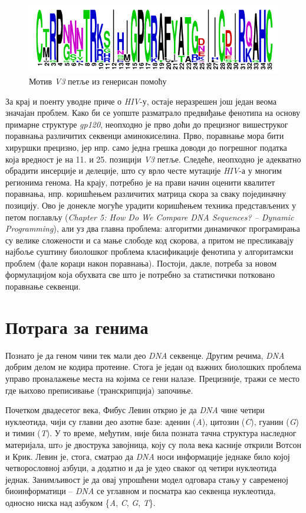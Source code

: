 \documentclass[12pt,oneside]{memoir}
\begin{document}
\begin{CJK}{UTF8}{ipxm}
\begin{figure}[!ht]
  \centering
  \includegraphics[width=.75\textwidth]{motif.png}
  \caption{Мотив \textit{V3} петље из \cite{compeau2015} генерисан помоћу \cite{weblogo}}
  \label{fig:motif}
\end{figure}

За крај и поенту уводне приче о \textit{HIV}-у, остаје неразрешен још један веома значајан проблем. Како би се уопште разматрало предвиђање фенотипа на основу примарне структуре \textit{gp120}, неопходно је прво доћи до прецизног вишеструког поравнања различитих секвенци аминокиселина. Прво, поравнање мора бити хируршки прецизно, јер нпр. само једна грешка доводи до погрешног податка која вредност је на 11. и 25. позицији \textit{V3} петље. Следеће, неопходно је адекватно обрадити инсерције и делеције, што су врло честе мутације \textit{HIV}-а у многим регионима генома. На крају, потребно је на прави начин оценити квалитет поравнања, нпр. коришћењем различитих матрица скора за сваку појединачну позицију. Ово је донекле могуће урадити коришћењем техника представљених у петом поглављу (\textit{Chapter 5: How Do We Compare DNA Sequences? -- Dynamic Programming}), али уз два главна проблема: алгоритми динамичког програмирања су велике сложености и са мање слободе код скорова, а притом не пресликавају најбоље суштину биолошког проблема класификације фенотипа у алгоритамски проблем (фале кораци након поравнања). Постоји, дакле, потреба за новом формулацијом која обухвата све што је потребно за статистички потковано поравнање секвенци.

\section{Потрага за генима}
Познато је да геном чини тек мали део \textit{DNA} секвенце. Другим речима, \textit{DNA} добрим делом не кодира протеине. Стога је један од важних биолошких проблема управо проналажење места на којима се гени налазе. Прецизније, тражи се место где њихово преписивање (транскрипција) започиње.

Почетком двадесетог века, Фибус Левин открио је да \textit{DNA} чине четири нуклеотида\cite{levene1910}, чији су главни део азотне базе: аденин (\textit{A}), цитозин (\textit{C}), гуанин (\textit{G}) и тимин (\textit{T}). У то време, међутим, није била позната тачна структура наследног материјала, штo је двострука завојница, коју су пола века касније открили Вотсон и Крик\cite{watson1953}. Левин је, стога, сматрао да \textit{DNA} носи информације једнаке било којој четворословној азбуци, а додатно и да је удео сваког од четири нуклеотида једнак. Занимљивост је да овај упрошћени модел одговара стању у савременој биоинформатици -- \textit{DNA} се углавном и посматра као секвенца нуклеотида, односно ниска над азбуком \{\textit{A}, \textit{C}, \textit{G}, \textit{T}\}.


\end{CJK}
\end{document}
